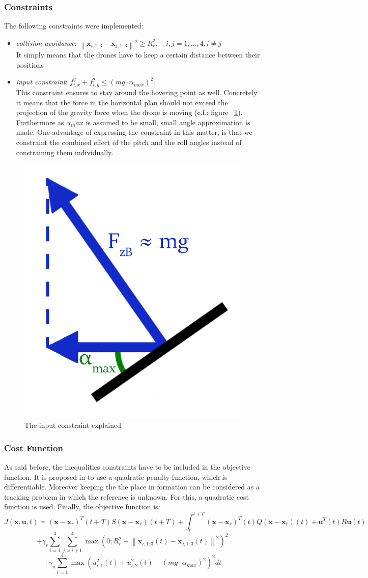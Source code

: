 \documentclass[a4paper, 12pt]{report}
\newcommand\norm[1]{\left\lVert#1\right\rVert}
\begin{document}
\subsubsection{Constraints}
The following constraints were implemented:
\begin{itemize}
\item \emph{collision avoidance}: $ \norm{\boldsymbol{x}_{i,1:3}-\boldsymbol{x}_{j,1:3}}^2 \geq R_r^2, \quad i,j = 1, \ldots, 4, i \neq j$\\
It simply means that the drones have to keep a certain distance between their positions
\item \emph{input constraint}:  $ f_{i,x}^2 + f_{i,y}^2 \leq (mg \cdot \alpha_{max})^2 $. \\
This constraint ensures to stay around the hovering point as well.  Concretely it means that the force in the horizontal plan should not exceed the projection of the gravity force when the drone is moving (c.f.: figure ~\ref{fig:inputConst}). Furthermore as $\alpha_max$ is assumed to be small, small angle approximation is made. One advantage of expressing the constraint in this matter, is that we constraint the combined effect of the pitch and the roll angles instead of  constraining them individually.
\end{itemize}

\begin{figure}[htbp]
\centering
\includegraphics[width=.4\textwidth]{Images/inputConst}
\caption{The input constraint explained}
\label{fig:inputConst}
\end{figure}

\subsubsection{Cost Function}
As said before, the inequalities constraints have to be included in the objective function. It is proposed in \cite{Ohtsuka2004} to use a quadratic penalty function, which is differentiable. Moreover keeping the the place in formation can be considered as a tracking problem in which the reference is unknown. For this, a quadratic cost function is used. Finally, the objective function is:
\[ J(\boldsymbol{x}, \boldsymbol{u}, t) = (\boldsymbol{x}-\boldsymbol{x}_r)^T(t+T)S(\boldsymbol{x}-\boldsymbol{x}_r)(t+T)  + \int_t^{t+T} (\boldsymbol{x}-\boldsymbol{x}_r)^T(t)Q(\boldsymbol{x}-\boldsymbol{x}_r)(t) + \boldsymbol{u}^T(t)R\boldsymbol{u}(t)  \]
\[ + \gamma_r \sum_{i=1}^3 \sum_{j=i+1}^4 \max(0; R_r^2 -  \norm{\boldsymbol{x}_{i,1:3}(t)-\boldsymbol{x}_{j,1:3}(t)}^2)^2 \]
\[+ \gamma_u \sum_{i=1}^4 \max(u_{i,1}^2(t) + u_{i,2}^2(t) - (mg \cdot \alpha_{max})^2)^2 dt \]
\end{document}

